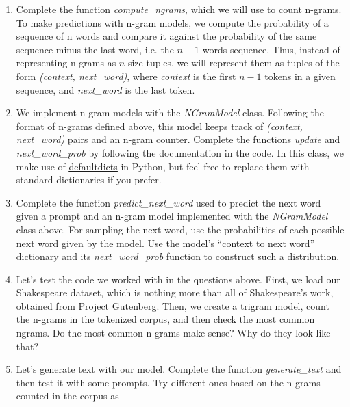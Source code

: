 \documentclass[11pt,a4paper]{article}
\begin{document}
\begin{enumerate}[label=(\alph*)]
    \item Complete the function \emph{compute\_ngrams}, which we will use to
          count n-grams.
          To make predictions with n-gram models, we compute the probability of
          a sequence of n words and compare it against the probability of the
          same sequence minus the last word, i.e. the $n-1$ words sequence.
          Thus, instead of representing n-grams as $n$-size tuples, we will
          represent them as tuples of the form \emph{(context, next\_word)},
          where \emph{context} is the first $ n-1$ tokens in a given sequence,
          and \emph{next\_word} is the last token.
    \item We implement n-gram models with the \emph{NGramModel} class.
          Following the format of n-grams defined above, this model keeps track
          of \emph{(context, next\_word)} pairs and an n-gram counter.
          Complete the functions \emph{update} and \emph{next\_word\_prob} by
          following the documentation in the code.
          In this class, we make use of
          \href{https://docs.python.org/3/library/collections.html#collections.defaultdict}{\underline{defaultdicts}}
          in Python, but feel free to replace them with standard dictionaries if
          you prefer.
    \item Complete the function \emph{predict\_next\_word} used to predict the
          next word given a prompt and an n-gram model implemented with the
          \emph{NGramModel} class above.
          For sampling the next word, use the probabilities of each possible
          next word given by the model.
          Use the model's ``context to next word'' dictionary and its
          \emph{next\_word\_prob} function to construct such a distribution.
    \item Let's test the code we worked with in the questions above.
          First, we load our Shakespeare dataset, which is nothing more than
          all of Shakespeare's work, obtained from
          \href{https://www.gutenberg.org/}{\underline{Project Gutenberg}}.
          Then, we create a trigram model, count the n-grams in the tokenized
          corpus, and then check the most common ngrams.
          Do the most common n-grams make sense? Why do they look like that?
    \item Let's generate text with our model.
          Complete the function \emph{generate\_text} and then test it with some
          prompts.
          Try different ones based on the n-grams counted in the corpus as

\end{enumerate}
\end{document}
